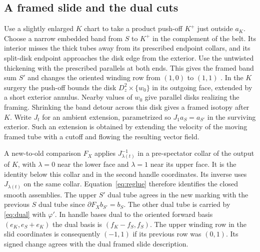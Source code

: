 \documentclass[11pt,letterpaper]{article}
\numberwithin{equation}{section}
\theoremstyle{remark}
\begin{document}
\subsection{A framed slide and the dual cuts}
Use a slightly enlarged \(K\) chart to take a product push-off
\(K^+\) just outside \(a_K\). Choose a narrow embedded band from
\(S\) to \(K^+\) in the complement of the belt. Its interior
misses the thick tubes away from its prescribed endpoint
collars, and its split-disk endpoint approaches the disk edge
from the exterior. Use the untwisted thickening with the
prescribed parallels at both ends. This gives the framed
band sum \(S'\) and changes the oriented winding row from
\((1,0)\) to \((1,1)\)
\cite[\S2 and Lemma 2.1]{GompfScharlemannThompson2010}.
In the \(K\) surgery the push-off bounds the disk
\(D^2_z\times\{w_0\}\) in its outgoing face, extended by a
short exterior annulus. Nearby values of \(w_0\) give
parallel disks realizing the framing. Shrinking the band
detour across this disk gives a framed isotopy after \(K\).
Write \(J_t\) for an ambient extension, parametrized so
\(J_1a_S=a_{S'}\) in the surviving exterior. Such an extension
is obtained by extending the velocity of the moving framed
tube with a cutoff and flowing the resulting vector field.

A new-to-old comparison \(F_X\) applies \(J_{\lambda(t)}^{-1}\)
in a pre-spectator collar of the output of \(K\), with
\(\lambda=0\) near the lower face and \(\lambda=1\) near
its upper face. It is the identity below this collar and in
the second handle coordinates. Its inverse uses
\(J_{\lambda(t)}\) on the same collar. Equation~\eqref{eq:reglue}
therefore identifies the closed smooth assemblies. The upper
\(S'\) dual tube agrees in the new marking with the previous
\(S\) dual tube since \(\partial F_X b_{S'}=b_S\). The other
dual tube is carried by \eqref{eq:dual} with \(\varphi'\). In handle
bases dual to the oriented forward basis
\((e_K,e_S+e_K)\) the dual basis is \((f_K-f_S,f_S)\).
The upper winding row in the slid coordinates is consequently
\((-1,1)\) if its previous row was \((0,1)\). Its signed
change agrees with the dual framed slide description.
\end{document}
